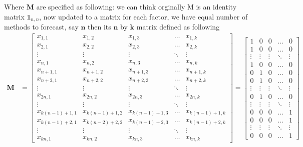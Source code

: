 \documentclass[12pt]{article}
\numberwithin{equation}{section}
\begin{document}
Where $\textbf{M}$  are specified as following:
we can think orginally M is an identity matrix $\mathbb{1}_{n,n}$, now updated to a matrix for each factor, we have equal number of methods to forecast, say $\textbf{n}$ then its $\textbf{n}$ by $\textbf{k}$ matrix defined as following 
\begin{align}
\textbf{M} & =
\begin{bmatrix}
    x_{1,1}     & x_{1,2}     & x_{1,3}     & \dots  & x_{1, k} \\
    x_{2,1}     & x_{2,2}     & x_{2,3}     & \dots  & x_{2, k} \\
    \vdots      & \vdots      & \vdots      & \ddots & \vdots \\
    x_{n,1}     & x_{n, 2}    & x_{n, 3}    & \dots  & x_{n, k} \\
    x_{n+1,1}   & x_{n+1, 2}  & x_{n+1, 3}  & \dots  & x_{n+1, k} \\
    x_{n+2,1}   & x_{n+2, 2}  & x_{n+2, 3}  & \dots  & x_{n+2, k} \\
    \vdots      & \vdots      & \vdots      & \ddots & \vdots \\
    x_{2n, 1}   & x_{2n, 2}   & x_{2n, 3}   & \dots  & x_{2n, k} \\
    \vdots      & \vdots      & \vdots      & \ddots & \vdots \\
    x_{k(n-1)+1,1}   & x_{k(n-1)+1, 2}  & x_{k(n-1)+1, 3}  & \dots  & x_{k(n-1)+1, k} \\
    x_{k(n-1)+2,1}   & x_{k(n-2)+2, 2}  & x_{k(n-1)+2, 3}  & \dots  & x_{k(n-1)+2, k} \\
    \vdots      & \vdots      & \vdots      & \ddots & \vdots \\
    x_{kn, 1}   & x_{kn, 2}   & x_{kn, 3}   & \dots  & x_{kn, k}
\end{bmatrix}
=
\begin{bmatrix}
    1     & 0     & 0     & \dots  & 0 \\
    1     & 0     & 0     & \dots  & 0 \\
    \vdots      & \vdots      & \vdots      & \ddots & \vdots \\
    1     & 0    & 0    & \dots  & 0 \\
    0     & 1  & 0  & \dots  & 0 \\
    0     & 1  & 0  & \dots  & 0 \\
    \vdots      & \vdots      & \vdots      & \ddots & \vdots \\
    0     & 1   & 0  & \dots  & 0 \\
    \vdots      & \vdots      & \vdots      & \ddots & \vdots \\
    0   & 0  & 0  & \dots  & 1 \\
    0   & 0  & 0  & \dots  & 1 \\
    \vdots      & \vdots      & \vdots      & \ddots & \vdots \\
    0   & 0   & 0   & \dots  & 1
\end{bmatrix}
\end{align}
\end{document}
